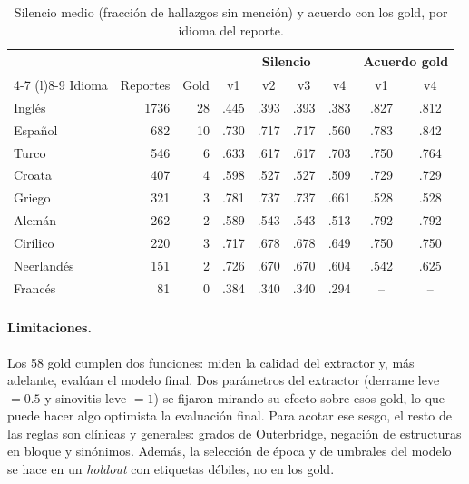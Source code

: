 \begin{table}[t]
  \caption{Silencio medio (fracción de hallazgos sin mención) y acuerdo con los gold, por idioma del reporte.}
  \label{tab:ext-idioma}
  \centering
  \small
  \begin{tabular}{@{}lrrcccccc@{}}
    \toprule
    & & & \multicolumn{4}{c}{Silencio} & \multicolumn{2}{c}{Acuerdo gold} \\
    \cmidrule(lr){4-7} \cmidrule(l){8-9}
    Idioma & Reportes & Gold & v1 & v2 & v3 & v4 & v1 & v4 \\
    \midrule
    Inglés     & 1736 & 28 & .445 & .393 & .393 & .383 & .827 & .812 \\
    Español    &  682 & 10 & .730 & .717 & .717 & .560 & .783 & .842 \\
    Turco      &  546 &  6 & .633 & .617 & .617 & .703 & .750 & .764 \\
    Croata     &  407 &  4 & .598 & .527 & .527 & .509 & .729 & .729 \\
    Griego     &  321 &  3 & .781 & .737 & .737 & .661 & .528 & .528 \\
    Alemán     &  262 &  2 & .589 & .543 & .543 & .513 & .792 & .792 \\
    Cirílico   &  220 &  3 & .717 & .678 & .678 & .649 & .750 & .750 \\
    Neerlandés &  151 &  2 & .726 & .670 & .670 & .604 & .542 & .625 \\
    Francés    &   81 &  0 & .384 & .340 & .340 & .294 & --   & --   \\
    \bottomrule
  \end{tabular}
\end{table}

\paragraph{Limitaciones.}
Los 58 gold cumplen dos funciones: miden la calidad del extractor y, más adelante, evalúan el modelo final.
Dos parámetros del extractor (derrame leve $=0.5$ y sinovitis leve $=1$) se fijaron mirando su efecto sobre esos gold, lo que puede hacer algo optimista la evaluación final.
Para acotar ese sesgo, el resto de las reglas son clínicas y generales: grados de Outerbridge, negación de estructuras en bloque y sinónimos.
Además, la selección de época y de umbrales del modelo se hace en un \emph{holdout} con etiquetas débiles, no en los gold.
